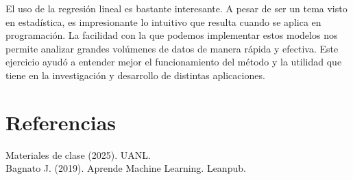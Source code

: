 \documentclass{article}
\begin{document}
El uso de la regresi\'on lineal es bastante interesante. A pesar de ser un tema visto en estad\'istica, es impresionante lo intuitivo que resulta cuando se aplica en programaci\'on. La facilidad con la que podemos implementar estos modelos nos permite analizar grandes vol\'umenes de datos de manera r\'apida y efectiva. Este ejercicio ayud\'o a entender mejor el funcionamiento del m\'etodo y la utilidad que tiene en la investigaci\'on y desarrollo de distintas aplicaciones.

\section{Referencias}

Materiales de clase (2025). UANL.\\
Bagnato J. (2019). Aprende Machine Learning. Leanpub.
\end{document}
